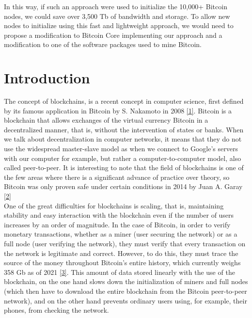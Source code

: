 \documentclass[12pt,a4paper]{article}
\newcommand{\source}[1]{\hyperlink{#1}{[#1]}}
\begin{document}
	In this way, if such an approach were used to initialize the 10,000+ Bitcoin nodes, we could save over 3,500 Tb of bandwidth and storage. To allow new nodes to initialize using this fast and lightweight approach, we would need to propose a modification to Bitcoin Core implementing our approach and a modification to one of the software packages used to mine Bitcoin.
	
	\renewcommand{\contentsname}{Table of contents}
	
	\tableofcontents
	
	\newpage
	
	\section{Introduction}
	
	The concept of blockchains, is a recent concept in computer science, first defined by its famous application in Bitcoin by S. Nakamoto in 2008 \source{1}. Bitcoin is a blockchain that allows exchanges of the virtual currency Bitcoin in a decentralized manner, that is, without the intervention of states or banks. When we talk about decentralization in computer networks, it means that they do not use the widespread master-slave model as when we connect to Google's servers with our computer for example, but rather a computer-to-computer model, also called peer-to-peer. It is interesting to note that the field of blockchains is one of the few areas where there is a significant advance of practice over theory, so Bitcoin was only proven safe under certain conditions in 2014 by Juan A. Garay \source{2}\\
	One of the great difficulties for blockchains is scaling, that is, maintaining stability and easy interaction with the blockchain even if the number of users increases by an order of magnitude. In the case of Bitcoin, in order to verify monetary transactions, whether as a miner (user securing the network) or as a full node (user verifying the network), they must verify that every transaction on the network is legitimate and correct. However, to do this, they must trace the source of the money throughout Bitcoin's entire history, which currently weighs 358 Gb as of 2021 \source{3}. This amount of data stored linearly with the use of the blockchain, on the one hand slows down the initialization of miners and full nodes (which then have to download the entire blockchain from the Bitcoin peer-to-peer network), and on the other hand prevents ordinary users using, for example, their phones, from checking the network.\\
\end{document}
